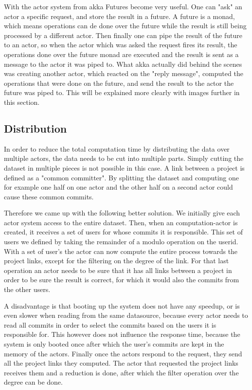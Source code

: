 \documentclass[10pt,a4paper]{article}
\begin{document}
With the actor system from akka Futures become very useful. One can "ask" an actor a specific request, and store the result in a future. A future is a monad, which means operations can de done over the future while the result is still being processed by a different actor.  Then finally one can pipe the result of the future to an actor, so when the actor which was asked the request fires its result, the operations done over the future monad are executed and the result is sent as a message to the actor it was piped to. What akka actually did behind the scenes was creating another actor, which reacted on the "reply message", computed the operations that were done on the future, and send the result to the actor the future was piped to. This will be explained more clearly with images further in this section.

\subsection{Distribution}

In order to reduce the total computation time by distributing the data over multiple actors, the data needs to be cut into multiple parts. Simply cutting the dataset in multiple pieces is not possible in this case. A link between a project is defined as a "common committer". By splitting the dataset and computing one for example one half on one actor and the other half on a second actor could cause these common commits. 

Therefore we came up with the following better solution. We initially give each actor system access to the entire dataset. Then, when an computation-actor is created, it receives a set of users for whose commits it is responsible. This set of users we defined by taking the remainder of a modulo operation on the userid. With a set of user's the actor can now compute the entire process towards the project links, except for the filtering on the degree of the link. For that last operation an actor needs to be sure that it has all links between a project in order to be sure the result is correct, for which it would also the commits from the other users.

A disadvantage is that booting up the system does not have any speedup, or is even slower when reading from the same datasource, because every actor needs to read all commits in order to select the commits based on the users it is responsible for. This however does not influence the response time, because the system is only booted once after which the user's commits are kept in the memory of the actors. Finally once the actors respond to the request, they send all the project links they computed. The actor that requested the project links receives them and a reduction is done, after which the filter operation over the degree can be done.
\end{document}
